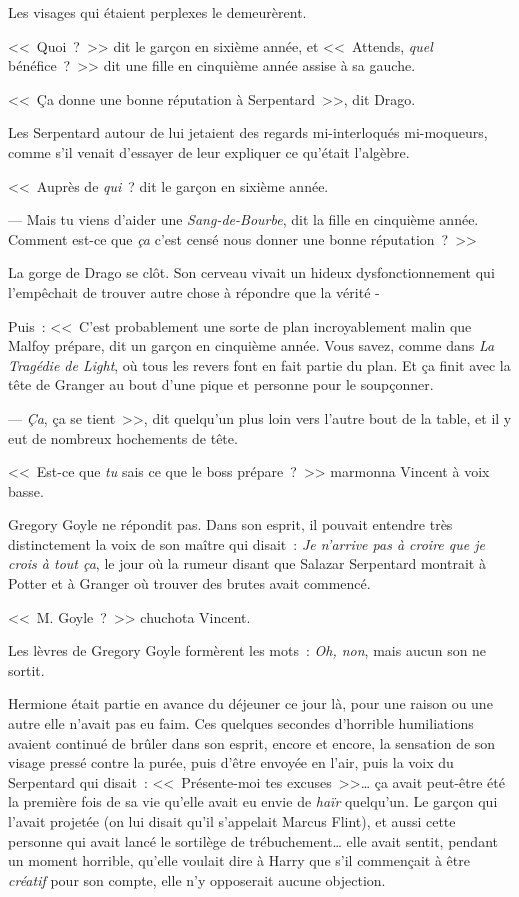 Les visages qui étaient perplexes le demeurèrent.

<<~Quoi~?~>> dit le garçon en sixième année, et <<~Attends, \emph{quel} bénéfice~?~>> dit une fille en cinquième année assise à sa gauche.

<<~Ça donne une bonne réputation à Serpentard~>>, dit Drago.

Les Serpentard autour de lui jetaient des regards mi-interloqués mi-moqueurs, comme s'il venait d'essayer de leur expliquer ce qu'était l'algèbre.

<<~Auprès de \emph{qui}~? dit le garçon en sixième année.

--- Mais tu viens d'aider une \emph{Sang-de-Bourbe}, dit la fille en cinquième année. Comment est-ce que \emph{ça} c'est censé nous donner une bonne réputation~?~>>

La gorge de Drago se clôt. Son cerveau vivait un hideux dysfonctionnement qui l'empêchait de trouver autre chose à répondre que la vérité -

Puis~: <<~C'est probablement une sorte de plan incroyablement malin que Malfoy prépare, dit un garçon en cinquième année. Vous savez, comme dans \emph{La Tragédie de Light}, où tous les revers font en fait partie du plan. Et ça finit avec la tête de Granger au bout d'une pique et personne pour le soupçonner.

--- \emph{Ça}, ça se tient~>>, dit quelqu'un plus loin vers l'autre bout de la table, et il y eut de nombreux hochements de tête.

\later

<<~Est-ce que \emph{tu} sais ce que le boss prépare~?~>> marmonna Vincent à voix basse.

Gregory Goyle ne répondit pas. Dans son esprit, il pouvait entendre très distinctement la voix de son maître qui disait~: \emph{Je n'arrive pas à croire que je crois à tout ça}, le jour où la rumeur disant que Salazar Serpentard montrait à Potter et à Granger où trouver des brutes avait commencé.

<<~M. Goyle~?~>> chuchota Vincent.

Les lèvres de Gregory Goyle formèrent les mots~: \emph{Oh, non}, mais aucun son ne sortit.

\later

Hermione était partie en avance du déjeuner ce jour là, pour une raison ou une autre elle n'avait pas eu faim. Ces quelques secondes d'horrible humiliations avaient continué de brûler dans son esprit, encore et encore, la sensation de son visage pressé contre la purée, puis d'être envoyée en l'air, puis la voix du Serpentard qui disait~: <<~Présente-moi tes excuses~>>… ça avait peut-être été la première fois de sa vie qu'elle avait eu envie de \emph{haïr} quelqu'un. Le garçon qui l'avait projetée (on lui disait qu'il s'appelait Marcus Flint), et aussi cette personne qui avait lancé le sortilège de trébuchement… elle avait sentit, pendant un moment horrible, qu'elle voulait dire à Harry que s'il commençait à être \emph{créatif} pour son compte, elle n'y opposerait aucune objection.

